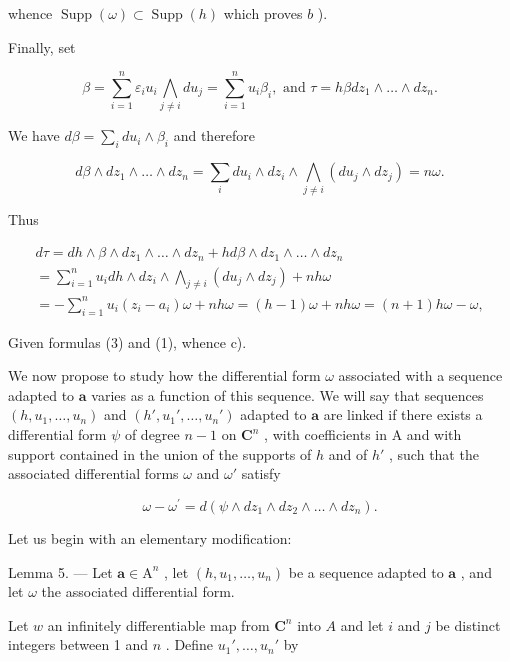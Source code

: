 whence \(\operatorname{Supp}(\omega) \subset \operatorname{Supp}(h)\) which proves \(b\) ).

Finally, set

\[
\beta = \sum_ {i = 1} ^ {n} \varepsilon_ {i} u _ {i} \bigwedge_ {j \neq i} d u _ {j} = \sum_ {i = 1} ^ {n} u _ {i} \beta_ {i}, \text {   and   } \tau = h \beta d z _ {1} \wedge \dots \wedge d z _ {n}.
\]

We have \(d\beta = \sum_{i}du_{i}\wedge \beta_{i}\) and therefore

\[
d \beta \wedge d z _ {1} \wedge \dots \wedge d z _ {n} = \sum_ {i} d u _ {i} \wedge d z _ {i} \wedge \bigwedge_ {j \neq i} (d u _ {j} \wedge d z _ {j}) = n \omega .
\]

Thus

\[
\begin{array}{l} d \tau = d h \wedge \beta \wedge d z _ {1} \wedge \dots \wedge d z _ {n} + h d \beta \wedge d z _ {1} \wedge \dots \wedge d z _ {n} \\ = \sum_ {i = 1} ^ {n} u _ {i} d h \wedge d z _ {i} \wedge \bigwedge_ {j \neq i} (d u _ {j} \wedge d z _ {j}) + n h \omega \\ = - \sum_ {i = 1} ^ {n} u _ {i} (z _ {i} - a _ {i}) \omega + n h \omega = (h - 1) \omega + n h \omega = (n + 1) h \omega - \omega , \end{array}
\]

Given formulas (3) and (1), whence c).

We now propose to study how the differential form \(\omega\) associated with a sequence adapted to \(\boldsymbol{a}\) varies as a function of this sequence. We will say that sequences \((h, u_1, \ldots, u_n)\) and \((h', u_1', \ldots, u_n')\) adapted to \(\boldsymbol{a}\) are linked if there exists a differential form \(\psi\) of degree \(n-1\) on \(\mathbf{C}^n\) , with coefficients in A and with support contained in the union of the supports of \(h\) and of \(h'\) , such that the associated differential forms \(\omega\) and \(\omega'\) satisfy

\[
\omega - \omega^ {\prime} = d (\psi \wedge d z _ {1} \wedge d z _ {2} \wedge \dots \wedge d z _ {n}).
\]

Let us begin with an elementary modification:

Lemma 5. --- Let \(\boldsymbol{a} \in \mathrm{A}^{n}\) , let \((h, u_{1}, \ldots, u_{n})\) be a sequence adapted to \(\boldsymbol{a}\) , and let \(\omega\) the associated differential form.

Let \(w\) an infinitely differentiable map from \(\mathbf{C}^n\) into \(A\) and let \(i\) and \(j\) be distinct integers between 1 and \(n\) . Define \(u_1', \ldots, u_n'\) by

